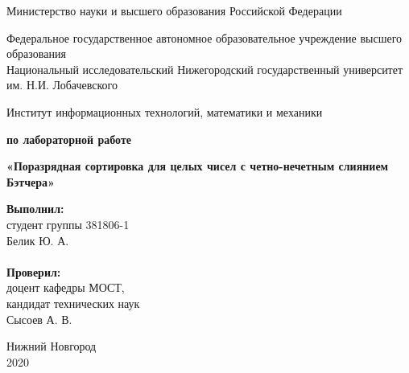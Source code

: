 \documentclass{report}
\begin{document}
	
	\begin{titlepage}
		
		\begin{center}
			Министерство науки и высшего образования Российской Федерации
		\end{center}
		
		\begin{center}
			Федеральное государственное автономное образовательное учреждение высшего образования \\
			Национальный исследовательский Нижегородский государственный университет им. Н.И. Лобачевского
		\end{center}
		
		\begin{center}
			Институт информационных технологий, математики и механики
		\end{center}
		
		\vspace{4em}
		
		\begin{center}
			\textbf{ по лабораторной работе} \\
		\end{center}
		\begin{center}
			\textbf{\Large«Поразрядная сортировка для целых чисел с четно-нечетным слиянием Бэтчера»} \\
		\end{center}
		
		\vspace{4em}
		
		\newbox{\lbox}
		\newlength{\maxl}
		\setlength{\maxl}{\wd\lbox}
		\hfill\parbox{7cm}{
			\hspace*{5cm}\hspace*{-5cm}\textbf{Выполнил:} \\ студент группы 381806-1 \\ Белик Ю. А.\\
			\\
			\hspace*{5cm}\hspace*{-5cm}\textbf{Проверил:}\\ доцент кафедры МОСТ, \\ кандидат технических наук \\ Сысоев А. В.\\
		}
		\vspace{\fill}
		
		\begin{center} Нижний Новгород \\ 2020 \end{center}
		
	\end{titlepage}
	
\end{document}
